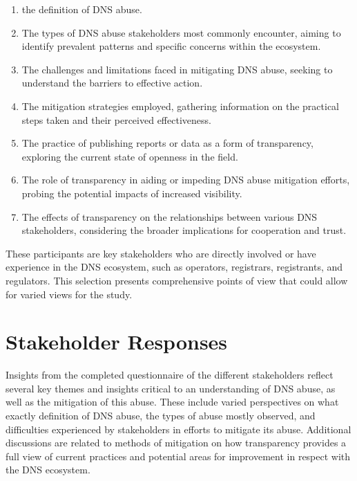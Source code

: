  \begin{enumerate}
 \item the definition of DNS abuse. 
  \item The types of DNS abuse stakeholders most commonly encounter, aiming to identify prevalent patterns and specific concerns within the ecosystem.
  
  \item The challenges and limitations faced in mitigating DNS abuse, seeking to understand the barriers to effective action.
  
  \item The mitigation strategies employed, gathering information on the practical steps taken and their perceived effectiveness.
  
  \item The practice of publishing reports or data as a form of transparency, exploring the current state of openness in the field.
  
  \item The role of transparency in aiding or impeding DNS abuse mitigation efforts, probing the potential impacts of increased visibility.
  
  \item  The effects of transparency on the relationships between various DNS stakeholders, considering the broader implications for cooperation and trust.
\end{enumerate}

 These participants are key stakeholders who are directly involved or have experience in the DNS ecosystem, such as operators, registrars, registrants, and regulators. This selection presents comprehensive points of view that could allow for varied views for the study.


\section{Stakeholder Responses} 

Insights from the completed questionnaire of the different stakeholders reflect several key themes and insights critical to an understanding of DNS abuse, as well as the mitigation of this abuse. These include varied perspectives on what exactly definition of DNS abuse, the types of abuse mostly observed, and difficulties experienced by stakeholders in efforts to mitigate its abuse. Additional discussions are related to methods of mitigation on how transparency provides a full view of current practices and potential areas for improvement in respect with the DNS ecosystem.


